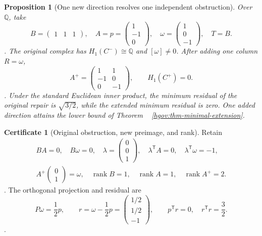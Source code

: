 \documentclass[12pt,a4paper,openany,notitlepage]{report}
\theoremstyle{plain}
\newtheorem{proposition}[theorem]{Proposition}
\theoremstyle{definition}
\newtheorem*{certificate}{Certificate}
\theoremstyle{remark}
\begin{document}
\begin{CJK*}
\begin{proposition} [One new direction resolves one independent obstruction]
\label{hgov:prop-three-dimensional}
Over $\mathbb Q$, take
\[
 B=\begin{pmatrix}1&1&1\end{pmatrix},\quad
 A=p=\begin{pmatrix}1\\-1\\0\end{pmatrix},\quad
 \omega=\begin{pmatrix}1\\0\\-1\end{pmatrix},\quad T=B.
\].
The original complex has $H_1(C^-)\cong\mathbb Q$ and $[\omega]\ne0$. After adding one column $R=\omega$,
\[
 A^+=
 \begin{pmatrix}
 1&1\\-1&0\\0&-1
 \end{pmatrix},\qquad
 H_1(C^+)=0.
\].
Under the standard Euclidean inner product, the minimum residual of the original repair is $\sqrt{3/2}$, while the extended minimum residual is zero. One added direction attains the lower bound of Theorem ~ \ref{hgov:thm-minimal-extension}.
\end{proposition}
\begin{certificate} [Original obstruction, new preimage, and rank]
Retain
\[
 \begin{gathered}
 BA=0,\quad B\omega=0,\quad
 \lambda=\begin{pmatrix}0\\0\\1\end{pmatrix},\quad
 \lambda^{\mathsf T}A=0,\quad
 \lambda^{\mathsf T}\omega=-1,\\
 A^+\begin{pmatrix}0\\1\end{pmatrix}=\omega,\quad
 \operatorname{rank}B=1,\quad
 \operatorname{rank}A=1,\quad
 \operatorname{rank}A^+=2.
 \end{gathered}
\].
The orthogonal projection and residual are
\[
 P\omega=\frac12p,\qquad
 r=\omega-\frac12p
   =\begin{pmatrix}1/2\\1/2\\-1\end{pmatrix},\qquad
 p^{\mathsf T}r=0,\quad r^{\mathsf T}r=\frac32.
\].
\end{certificate}

\end{CJK*}
\end{document}
